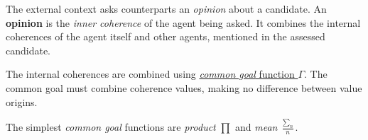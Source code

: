 \documentclass[../ThesisDoc]{subfiles}
\begin{document}
\providecommand{\rootdir}{..}

The external context asks counterparts an \emph{opinion} about a candidate.
An \textbf{opinion} is the \emph{inner coherence} of the agent being asked.
It combines the internal coherences of the agent itself and other agents,
mentioned in the assessed candidate.



The internal coherences are combined using
\underline{\emph{common goal} function $\Gamma$}.
The common goal must combine coherence values, making no difference
between value origins.

The simplest \emph{common goal} functions are \emph{product} $\prod$
and \emph{mean} $\frac{\sum_n}{n}$.


\end{document}

